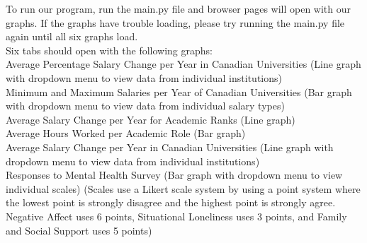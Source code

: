 \documentclass{article}
\begin{document}
To run our program, run the main.py file and browser pages will open with our graphs. If the graphs have trouble loading, please try running the main.py file again until all six graphs load.\\
Six tabs should open with the following graphs:\\
Average Percentage Salary Change per Year in Canadian Universities (Line graph with dropdown menu to view data from individual institutions)\\
Minimum and Maximum Salaries per Year of Canadian Universities (Bar graph with dropdown menu to view data from individual salary types)\\
Average Salary Change per Year for Academic Ranks (Line graph)\\
Average Hours Worked per Academic Role (Bar graph)\\
Average Salary Change per Year in Canadian Universities (Line graph with dropdown menu to view data from individual institutions)\\
Responses to Mental Health Survey (Bar graph with dropdown menu to view individual scales) (Scales use a Likert scale system by using a point system where the lowest point is strongly disagree and the highest point is strongly agree. Negative Affect uses 6 points, Situational Loneliness uses 3 points, and Family and Social Support uses 5 points)\\\hfill \break
\end{document}
